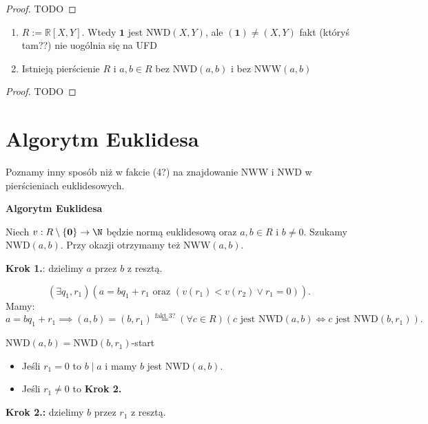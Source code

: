 \begin{proof}
	TODO
\end{proof} 
\begin{remark}
	\begin{enumerate}[label=\arabic*)]
		\item $R:=\mathbb{R} \left[ X,Y \right] $. Wtedy $\mathbf{1}$ jest $\text{NWD}\left( X,Y \right) $, ale $\left( \mathbf{1} \right) \neq \left( X,Y \right) $ fakt (któryś tam??) nie uogólnia się na UFD
		\item Istnieją pierścienie $R$ i $a,b \in R$ bez $\text{NWD}\left( a,b \right) $ i bez $\text{NWW}\left( a,b \right) $ 
	\end{enumerate}
\end{remark} 
\begin{proof}
	TODO
\end{proof} 
\section{Algorytm Euklidesa}

Poznamy inny sposób niż w fakcie (4?) na znajdowanie NWW i NWD w pierścieniach euklidesowych.

\noindent \textbf{Algorytm Euklidesa} 

Niech $v: R\setminus \{\mathbf{0}\} \to \N$ będzie normą euklidesową oraz $a,b\in R$ i $b\neq 0$. Szukamy $\text{NWD}\left( a,b \right) $. Przy okazji otrzymamy też $\text{NWW}\left( a,b \right) $.

\noindent \textbf{Krok 1.}: dzielimy $a$ przez $b$ z resztą.

\[
\left(\exists q_1,r_1 \right)\left( a=bq_1+r_1 \text{ oraz } \left( v\left( r_1 \right) < v\left( r_2 \right) \lor r_1 = 0 \right) \right)  
.\] 
Mamy:
\[
a = bq_1+r_1 \implies \left( a,b \right) = \left( b,r_1 \right) \overset{\text{fakt 3?}}{=} \left(\forall c\in R \right)\left( c \text{ jest }\text{NWD}\left( a,b \right) \iff c \text{ jest } \text{NWD}\left( b,r_1 \right)  \right)  
.\] 

$\text{NWD}\left( a,b \right) = \text{NWD}\left( b,r_1 \right) $-start
\begin{itemize}
	\item Jeśli $r_1 = 0 $ to $b\mid a$ i mamy $b$ jest $\text{NWD}\left( a,b \right) $.
	\item Jeśli $r_1\neq 0$ to \textbf{Krok 2.} 
\end{itemize}

\noindent \textbf{Krok 2.:} dzielimy $b$ przez $r_1$ z resztą.

